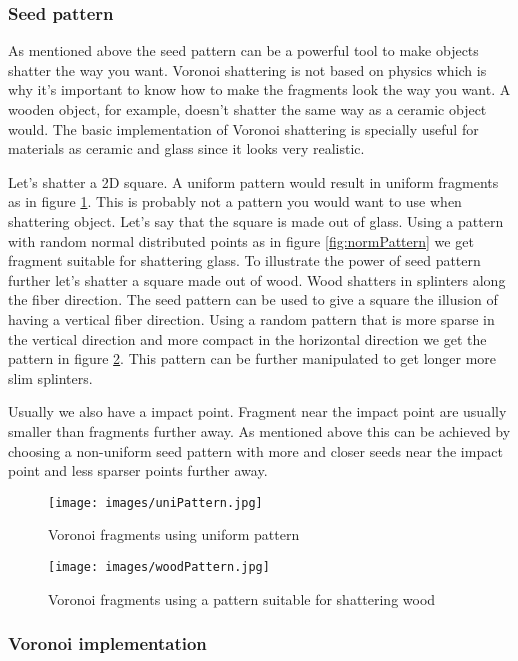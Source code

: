 \documentclass[10pt]{article}
\begin{document}
\subsubsection{Seed pattern}
As mentioned above the seed pattern can be a powerful tool to make objects
shatter the way you want. Voronoi shattering is not based on physics which is
why it's important to know how to make the fragments look the way you want.
A wooden object, for example, doesn't shatter the same way as a ceramic object
would. The basic implementation of Voronoi shattering is specially useful for
materials as ceramic and glass since it looks very realistic.

Let's shatter a 2D square. A uniform pattern would result in uniform fragments
as in figure \ref{fig:uniPattern}. This is probably not a pattern you would
want to use when shattering object. Let's say that the square is made out of
glass. Using a pattern with random normal distributed points as in figure
\ref{fig:normPattern} we get fragment suitable for shattering glass. To
illustrate the power of seed pattern further let's shatter a square made out
of wood. Wood shatters in splinters along the fiber direction. The seed pattern
can be used to give a square the illusion of having a vertical fiber direction.
Using a random pattern that is more sparse in the vertical direction and more
compact in the horizontal direction we get the pattern in figure \ref{fig:woodPattern}.
This pattern can be further manipulated to get longer more slim splinters.

Usually we also have a impact point. Fragment near the impact point are usually
smaller than fragments further away. As mentioned above this can be achieved
by choosing a non-uniform seed pattern with more and closer seeds near the impact
point and less sparser points further away.

\begin{figure}
    \centering
    \texttt{[image: images/uniPattern.jpg]}
    \caption{Voronoi fragments using uniform pattern}
    \label{fig:uniPattern}
\end{figure}

\begin{figure}
    \centering
    \texttt{[image: images/woodPattern.jpg]}
    \caption{Voronoi fragments using a pattern suitable for shattering wood}
    \label{fig:woodPattern}
\end{figure}


\subsubsection{Voronoi implementation}
\end{document}
